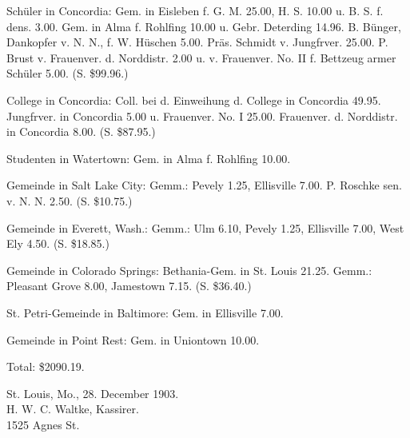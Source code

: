 Schüler in Concordia: Gem. in Eisleben f. G. M. 25.00, H. S. 10.00 u. B. S. f. dens. 3.00. Gem. in Alma f. Rohlfing 10.00 u. Gebr. Deterding 14.96. B. Bünger, Dankopfer v. N. N., f. W. Hüschen 5.00. Präs. Schmidt v. Jungfrver. 25.00. P. Brust v. Frauenver. d. Norddistr. 2.00 u. v. Frauenver. No. II f. Bettzeug armer Schüler 5.00. (S. \$99.96.)

College in Concordia: Coll. bei d. Einweihung d. College in Concordia 49.95. Jungfrver. in Concordia 5.00 u. Frauenver. No. I 25.00. Frauenver. d. Norddistr. in Concordia 8.00. (S. \$87.95.)

Studenten in Watertown: Gem. in Alma f. Rohlfing 10.00.

Gemeinde in Salt Lake City: Gemm.: Pevely 1.25, Ellisville 7.00. P. Roschke sen. v. N. N. 2.50. (S. \$10.75.)

Gemeinde in Everett, Wash.: Gemm.: Ulm 6.10, Pevely 1.25, Ellisville 7.00, West Ely 4.50. (S. \$18.85.)

Gemeinde in Colorado Springs: Bethania-Gem. in St. Louis 21.25. Gemm.: Pleasant Grove 8.00, Jamestown 7.15. (S. \$36.40.)

St. Petri-Gemeinde in Baltimore: Gem. in Ellisville 7.00.

Gemeinde in Point Rest: Gem. in Uniontown 10.00.

Total: \$2090.19.

\begin{unterschrift}
St. Louis, Mo., 28. December 1903.\\
H. W. C. Waltke, Kassirer.\\
1525 Agnes St.
\end{unterschrift}
